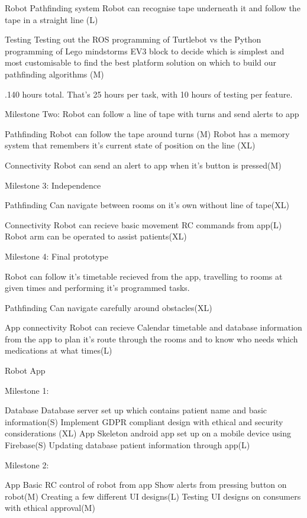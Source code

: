 \documentclass{article}
\begin{document}
Robot Pathfinding system
    Robot can recognise tape underneath it and follow the tape in a straight line (L)
    
Testing
    Testing out the ROS programming of Turtlebot vs the Python programming of Lego mindstorms EV3 block to decide which is simplest and     most customisable to find the best platform solution on which to build our pathfinding algorithms (M)
    
.140 hours total. That's 25 hours per task, with 10 hours of testing per feature.

Milestone Two: Robot can follow a line of tape with turns and send alerts to app 

Pathfinding
    Robot can follow the tape around turns (M)
    Robot has a memory system that remembers it's current state of position on the line (XL)
    
Connectivity    
    Robot can send an alert to app when it's button is pressed(M) 
    
Milestone 3: Independence
    
Pathfinding
    Can navigate between rooms on it's own without line of tape(XL)
    
Connectivity 
    Robot can recieve basic movement RC commands from app(L)
    Robot arm can be operated to assist patients(XL)   
   
    
Milestone 4: Final prototype

Robot can follow it's timetable recieved from the app, travelling to rooms at given times and performing it's programmed tasks.

Pathfinding
    Can navigate carefully around obstacles(XL)       
    
App connectivity 
    Robot can recieve Calendar timetable and database information from the app to plan it's route through the rooms and to know who needs which medications at what times(L)
    
Robot App

Milestone 1:

Database
    Database server set up which contains patient name and basic information(S)
    Implement GDPR compliant design with ethical and security considerations (XL)
App
    Skeleton android app set up on a mobile device using Firebase(S)
    Updating database patient information through app(L)
    
Milestone 2:

App
    Basic RC control of robot from app
    Show alerts from pressing button on robot(M)
    Creating a few different UI designs(L)
    Testing UI designs on consumers with ethical approval(M)
    
\end{document}
